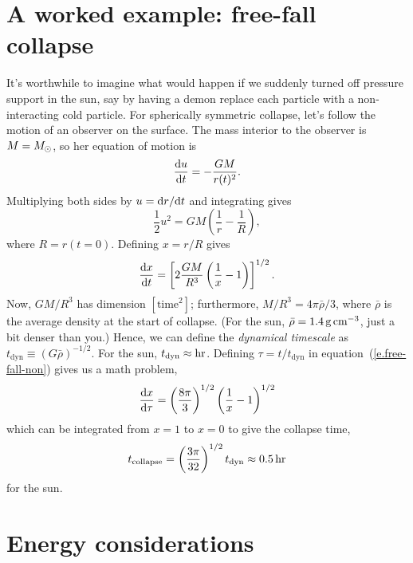 \section{A worked example: free-fall collapse}

It's worthwhile to imagine what would happen if we suddenly turned off pressure support in the sun, say by having a demon replace each particle with a non-interacting cold particle. For spherically symmetric collapse, let's follow the motion of an observer on the surface.  The mass interior to the observer is $M = M_\odot$, so her equation of motion is
\begin{equation}\label{e.free-fall-eq-motion}
\frac{\mathrm{d} u}{\mathrm{d} t} = -\frac{GM}{r(t)^{2}}.
\end{equation}
Multiplying both sides by $u = \mathrm{d} r/\mathrm{d} t$ and integrating gives
\[
\frac{1}{2} u^{2} = GM\left(\frac{1}{r} - \frac{1}{R}\right),
\]
where $R = r(t=0)$. Defining $x = r/R$ gives
\begin{equation}\label{e.free-fall-non}
\frac{\mathrm{d} x}{\mathrm{d} t} = \left[2 \frac{GM}{R^{3}}\left(\frac{1}{x}-1\right)\right]^{1/2}.
\end{equation}
Now, $GM/R^{3}$ has dimension $[\textrm{time}^{2}]$; furthermore, $M/R^{3} = 4\pi\bar{\rho}/3$, where $\bar{\rho}$ is the average density at the start of collapse.  (For the sun, $\bar{\rho} = 1.4\,\mathrm{g}\,{\mathrm{c}\mathrm{m}}^{-3}$, just a bit denser than you.) Hence, we can define the \emph{dynamical timescale} as $t_{\mathrm{dyn}}\equiv (G\bar{\rho})^{-1/2}$.  For the sun, $t_{\mathrm{dyn}}\approx \mathrm{hr}$.  Defining $\tau = t/t_{\mathrm{dyn}}$ in equation~(\ref{e.free-fall-non}) gives us a math problem,
\[
\frac{\mathrm{d} x}{\mathrm{d}\tau} = \left(\frac{8\pi}{3}\right)^{1/2}\left(\frac{1}{x}-1\right)^{1/2}
\]
which can be integrated from $x = 1$ to $x=0$ to give the collapse time,
\[
t_{\mathrm{collapse}} = \left(\frac{3\pi}{32}\right)^{1/2}t_{\mathrm{dyn}} \approx 0.5\,\mathrm{hr}
\]
for the sun.

\section{Energy considerations}

